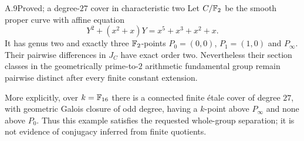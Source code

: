 \begin{claim}{A.9}{Proved; a degree-$27$ cover in characteristic two}
Let $C/\mathbb F_2$ be the smooth proper curve with affine equation
\[
 Y^2+(x^2+x)Y=x^5+x^3+x^2+x.
\]
It has genus two and exactly three $\mathbb F_2$-points
$P_0=(0,0)$, $P_1=(1,0)$ and $P_\infty$. Their pairwise
differences in $J_C$ have exact order two. Nevertheless their
section classes in the geometrically prime-to-$2$ arithmetic
fundamental group remain pairwise distinct after every finite
constant extension.

More explicitly, over $k=\mathbb F_{16}$ there is a connected finite
\'etale cover of degree $27$, with geometric Galois closure of odd
degree, having a $k$-point above $P_\infty$ and none above $P_0$.
Thus this example satisfies the requested whole-group separation;
it is not evidence of conjugacy inferred from finite quotients.
\end{claim}
